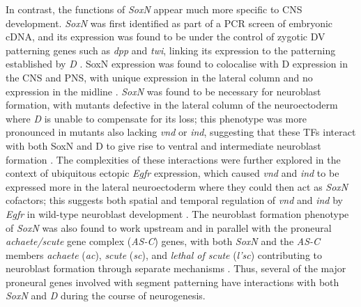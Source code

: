 \documentclass[withindex,glossary]{cam-thesis}
\begin{document}
In contrast, the functions of \emph{SoxN} appear much more specific to
CNS development. \emph{SoxN} was first identified as part of a PCR
screen of embryonic cDNA, and its expression was found to be under the
control of zygotic DV patterning genes such as \emph{dpp} and
\emph{twi}, linking its expression to the patterning established by
\emph{D} . SoxN expression was found to colocalise
with D expression in the CNS and PNS, with unique expression in the
lateral column and no expression in the midline . \emph{SoxN} was found to be necessary for
neuroblast formation, with mutants defective in the lateral column of
the neuroectoderm where \emph{D} is unable to compensate for its loss;
this phenotype was more pronounced in mutants also lacking \emph{vnd} or
\emph{ind}, suggesting that these TFs interact with both SoxN and D to
give rise to ventral and intermediate neuroblast formation . The complexities
of these interactions were further explored in the context of ubiquitous
ectopic \emph{Egfr} expression, which caused \emph{vnd} and \emph{ind}
to be expressed more in the lateral neuroectoderm where they could then
act as \emph{SoxN} cofactors; this suggests both spatial and temporal
regulation of \emph{vnd} and \emph{ind} by \emph{Egfr} in wild-type
neuroblast development . The neuroblast formation
phenotype of \emph{SoxN} was also found to work upstream and in parallel
with the proneural \emph{achaete/scute} gene complex (\emph{\gls{AS-C}})
genes, with both \emph{SoxN} and the \emph{AS-C} members \emph{achaete}
(\emph{ac}), \emph{scute} (\emph{sc}), and \emph{lethal of scute}
(\emph{l'sc}) contributing to neuroblast formation through separate
mechanisms . Thus, several
of the major proneural genes involved with segment patterning
 have interactions with both \emph{SoxN}
and \emph{D} during the course of neurogenesis.
\end{document}
